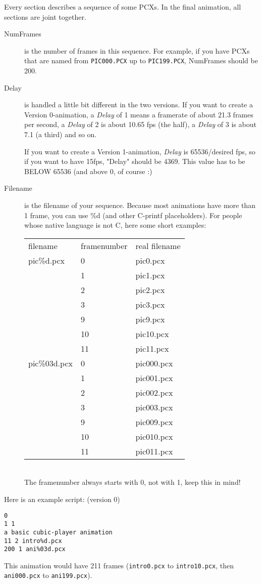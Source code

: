 Every section describes a sequence of some PCXs. In the final animation,
all sections are joint together.
\begin{description}
\item[NumFrames] is the number of frames in this sequence. For example, if
you have PCXs that are named from \texttt{PIC000.PCX} up to
\texttt{PIC199.PCX}, NumFrames should be 200. 
\item[Delay] is handled a little bit different in the two versions. If you
want to create a Version 0-animation, a \emph{Delay} of 1 means a framerate
of about 21.3 frames per second, a \emph{Delay} of 2 is about 10.65 fps (the
half), a \emph{Delay} of 3 is about 7.1 (a third) and so on.

If  you  want  to create a Version 1-animation, \emph{Delay} is 65536/desired
fps, so if you want to have 15fps, "Delay" should be 4369. This value has to
be BELOW 65536 (and above 0, of course :)
\item[Filename] is the filename of your sequence. Because most animations 
have more than 1 frame, you can use \%d (and other C-printf placeholders).
For people whose native language is not C, here some short examples: \\
\begin{tabular}{lll} 
filename      &  framenumber  &   real filename \\
pic\%d.pcx    &  0            &   pic0.pcx      \\
              &  1            &   pic1.pcx      \\
              &  2            &   pic2.pcx      \\
              &  3            &   pic3.pcx      \\
              &  9            &   pic9.pcx      \\
              &  10           &   pic10.pcx     \\
              &  11           &   pic11.pcx     \\
pic\%03d.pcx  &  0            &   pic000.pcx    \\
              &  1            &   pic001.pcx    \\
              &  2            &   pic002.pcx    \\
              &  3            &   pic003.pcx    \\
              &  9            &   pic009.pcx    \\
              &  10           &   pic010.pcx    \\
              &  11           &   pic011.pcx    \\
\end{tabular} \\
The framenumber always starts with 0, not with 1, keep this in mind! 
\end{description} 
Here is an example script: (version 0) 
\begin{verbatim} 
0 
1 1 
a basic cubic-player animation 
11 2 intro%d.pcx 
200 1 ani%03d.pcx 
\end{verbatim} 
This animation would have 211 frames (\texttt{intro0.pcx} to
\texttt{intro10.pcx}, then \texttt{ani000.pcx} to \texttt{ani199.pcx}). 
 
